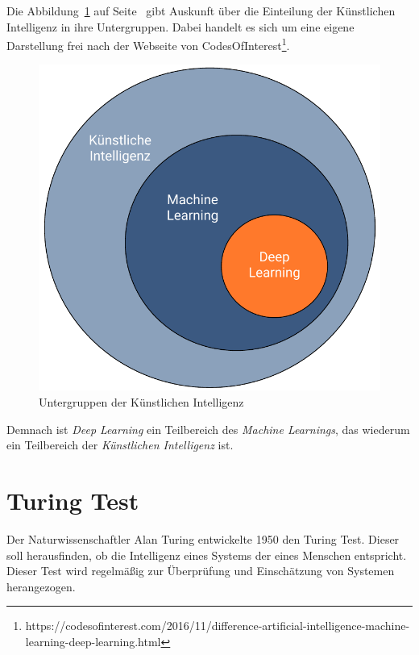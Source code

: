Die Abbildung~\ref{fig:grundlagen_artificialintelligence} auf Seite~\pageref{fig:grundlagen_artificialintelligence} gibt
Auskunft über die Einteilung der Künstlichen Intelligenz in ihre Untergruppen. Dabei handelt es sich um eine eigene
Darstellung frei nach der Webseite von
CodesOfInterest\footnote{https://codesofinterest.com/2016/11/difference-artificial-intelligence-machine-learning-deep-learning.html}.

\begin{figure}[h]
    \centering
    \includegraphics[scale=0.55]{images/kapitel_2/kuenstliche_intelligenz.pdf}
    \caption{Untergruppen der Künstlichen Intelligenz}
    \label{fig:grundlagen_artificialintelligence}
\end{figure}

Demnach ist \textit{Deep Learning} ein Teilbereich des \textit{Machine Learnings}, das wiederum ein Teilbereich der
\textit{Künstlichen Intelligenz} ist.

\section{Turing Test}
Der Naturwissenschaftler Alan Turing entwickelte 1950 den Turing Test. Dieser soll herausfinden, ob die Intelligenz
eines Systems der eines Menschen entspricht. Dieser Test wird regelmäßig zur Überprüfung und Einschätzung von Systemen
herangezogen.

